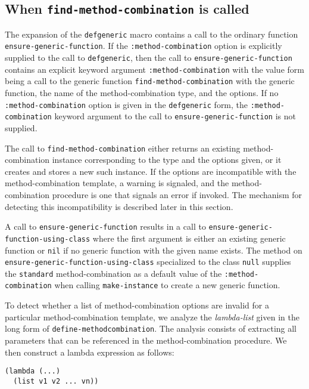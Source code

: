 \subsection{When \texttt{find-method-combination} is called}

The expansion of the \texttt{defgeneric} macro contains a call to the
ordinary function \texttt{ensure-generic-function}.  If the
\texttt{:method-combination} option is explicitly supplied to the call
to \texttt{defgeneric}, then the call to
\texttt{ensure-generic-function} contains an explicit keyword argument
\texttt{:method-combination} with the value form being a call to the
generic function \texttt{find-method-combination} with the generic
function, the name of the method-combination type, and the options.
If no \texttt{:method-combination} option is given in the
\texttt{defgeneric} form, the \texttt{:method-combination} keyword
argument to the call to \texttt{ensure-generic-function} is not supplied.

The call to \texttt{find-method-combination} either returns an existing
method-combination instance corresponding to the type and the options
given, or it creates and stores a new such instance.  If the options
are incompatible with the method-combination template, a warning is
signaled, and the method-combination procedure is one that signals an
error if invoked.  The mechanism for detecting this incompatibility is
described later in this section.

A call to \texttt{ensure-generic-function} results in a call to
\texttt{ensure-generic-function-using-class} where the first argument
is either an existing generic function or \texttt{nil} if no generic
function with the given name exists.  The method on
\texttt{ensure-generic-function-using-class} specialized to the class
\texttt{null} supplies the \texttt{standard} method-combination as a
default value of the \texttt{:method-combination} when calling
\texttt{make-instance} to create a new generic function.

To detect whether a list of method-combination options are invalid for
a particular method-combination template, we analyze the
\emph{lambda-list} given in the long form of
\texttt{define-method\-combination}.  The analysis consists of
extracting all parameters that can be referenced in the
method-combination procedure.  We then construct a lambda expression
as follows:

\begin{verbatim}
(lambda (...)
  (list v1 v2 ... vn))
\end{verbatim}

